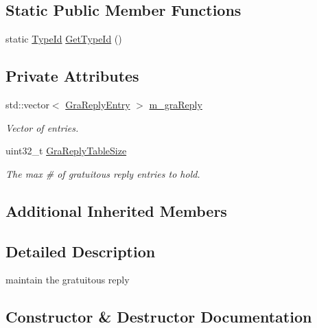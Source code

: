 \subsection*{Static Public Member Functions}
\begin{DoxyCompactItemize}
\item 
static \hyperlink{classns3_1_1TypeId}{Type\+Id} \hyperlink{classns3_1_1dsr_1_1DsrGraReply_a195b91a840988f7c0f0026131f478364}{Get\+Type\+Id} ()
\end{DoxyCompactItemize}
\subsection*{Private Attributes}
\begin{DoxyCompactItemize}
\item 
std\+::vector$<$ \hyperlink{structns3_1_1dsr_1_1GraReplyEntry}{Gra\+Reply\+Entry} $>$ \hyperlink{classns3_1_1dsr_1_1DsrGraReply_a406e9b99c8a2d8bd6a4d579468f00d12}{m\+\_\+gra\+Reply}
\begin{DoxyCompactList}\small\item\em Vector of entries. \end{DoxyCompactList}\item 
uint32\+\_\+t \hyperlink{classns3_1_1dsr_1_1DsrGraReply_a506a24375a22d638afa8d42daeecb368}{Gra\+Reply\+Table\+Size}
\begin{DoxyCompactList}\small\item\em The max \# of gratuitous reply entries to hold. \end{DoxyCompactList}\end{DoxyCompactItemize}
\subsection*{Additional Inherited Members}


\subsection{Detailed Description}
maintain the gratuitous reply 

\subsection{Constructor \& Destructor Documentation}
